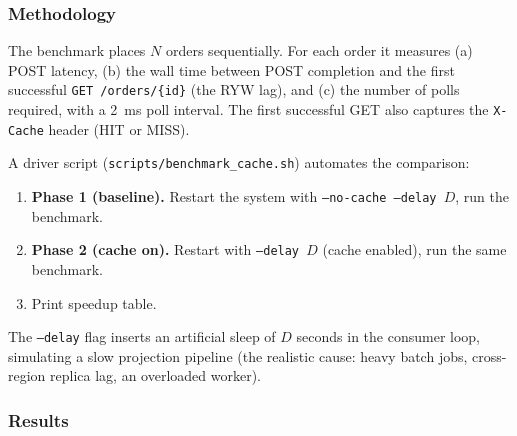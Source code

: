\documentclass[11pt,a4paper]{article}
\newcommand{\code}[1]{\texttt{\small #1}}
\newcommand{\file}[1]{\textcolor{primary}{\texttt{\small #1}}}
\begin{document}
\subsubsection{Methodology}

The benchmark places $N$ orders sequentially. For each order it measures (a) POST latency, (b) the wall time between POST completion and the first successful \code{GET /orders/\{id\}} (the RYW lag), and (c) the number of polls required, with a 2~ms poll interval. The first successful GET also captures the \code{X-Cache} header (HIT or MISS).

A driver script (\file{scripts/benchmark\_cache.sh}) automates the comparison:

\begin{enumerate}
  \item \textbf{Phase 1 (baseline).} Restart the system with \code{--no-cache --delay $D$}, run the benchmark.
  \item \textbf{Phase 2 (cache on).} Restart with \code{--delay $D$} (cache enabled), run the same benchmark.
  \item Print speedup table.
\end{enumerate}

The \code{--delay} flag inserts an artificial sleep of $D$ seconds in the consumer loop, simulating a slow projection pipeline (the realistic cause: heavy batch jobs, cross-region replica lag, an overloaded worker).

\subsubsection{Results}
\end{document}
